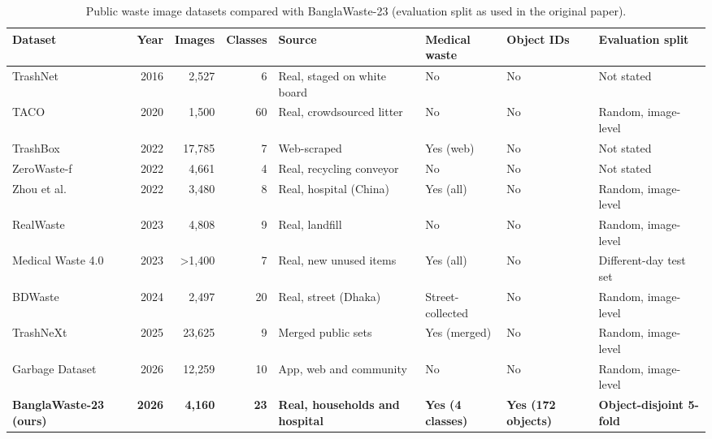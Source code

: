 \begin{table}[!htbp]
\centering
\scriptsize
\caption{Public waste image datasets compared with BanglaWaste-23 (evaluation split as used in the original paper).}
\label{tab:datasets}
\begin{adjustbox}{max width=\textwidth}
\begin{tabular}{@{}lrrrllll@{}}
\toprule
Dataset & Year & Images & Classes & Source & Medical waste & Object IDs & Evaluation split \\
\midrule
TrashNet \citep{yang2016trashnet} & 2016 & 2,527 & 6 & Real, staged on white board & No & No & Not stated \\
TACO \citep{proenca2020taco} & 2020 & 1,500 & 60 & Real, crowdsourced litter & No & No & Random, image-level \\
TrashBox \citep{kumsetty2022trashbox} & 2022 & 17,785 & 7 & Web-scraped & Yes (web) & No & Not stated \\
ZeroWaste-f \citep{bashkirova2022zerowaste} & 2022 & 4,661 & 4 & Real, recycling conveyor & No & No & Not stated \\
Zhou et al. \citep{zhou2022medical} & 2022 & 3,480 & 8 & Real, hospital (China) & Yes (all) & No & Random, image-level \\
RealWaste \citep{single2023realwaste} & 2023 & 4,808 & 9 & Real, landfill & No & No & Random, image-level \\
Medical Waste 4.0 \citep{bruno2023medical} & 2023 & >1,400 & 7 & Real, new unused items & Yes (all) & No & Different-day test set \\
BDWaste \citep{rahman2024bdwaste} & 2024 & 2,497 & 20 & Real, street (Dhaka) & Street-collected & No & Random, image-level \\
TrashNeXt \citep{tanvir2025trashnext} & 2025 & 23,625 & 9 & Merged public sets & Yes (merged) & No & Random, image-level \\
Garbage Dataset \citep{kunwar2026garbage} & 2026 & 12,259 & 10 & App, web and community & No & No & Random, image-level \\
\textbf{BanglaWaste-23 (ours)} & \textbf{2026} & \textbf{4,160} & \textbf{23} & \textbf{Real, households and hospital} & \textbf{Yes (4 classes)} & \textbf{Yes (172 objects)} & \textbf{Object-disjoint 5-fold} \\
\bottomrule
\end{tabular}
\end{adjustbox}
\end{table}
